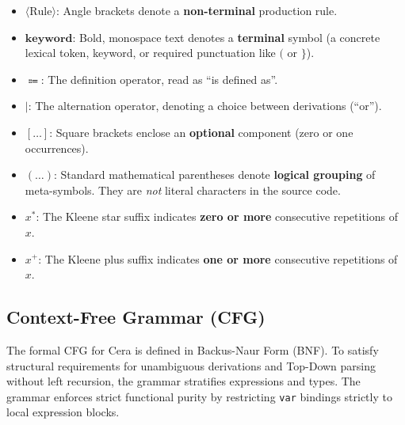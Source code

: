 \documentclass[11pt, a4paper]{article}
\begin{document}
\begin{itemize}
    \item $\langle \text{Rule} \rangle$: Angle brackets denote a \textbf{non-terminal} production rule.
    \item $\mathbf{keyword}$: Bold, monospace text denotes a \textbf{terminal} symbol (a concrete lexical token, keyword, or required punctuation like $\mathbf{(}$ or $\mathbf{\}}$).
    \item $\Coloneqq$: The definition operator, read as ``is defined as''.
    \item $\mid$: The alternation operator, denoting a choice between derivations (``or'').
    \item $[ \dots ]$: Square brackets enclose an \textbf{optional} component (zero or one occurrences).
    \item $( \dots )$: Standard mathematical parentheses denote \textbf{logical grouping} of meta-symbols. They are \textit{not} literal characters in the source code.
    \item $x^*$: The Kleene star suffix indicates \textbf{zero or more} consecutive repetitions of $x$.
    \item $x^+$: The Kleene plus suffix indicates \textbf{one or more} consecutive repetitions of $x$.
\end{itemize}

\subsection{Context-Free Grammar (CFG)}

The formal CFG for Cera is defined in Backus-Naur Form (BNF). To satisfy structural requirements for unambiguous derivations and Top-Down parsing without left recursion, the grammar stratifies expressions and types. The grammar enforces strict functional purity by restricting \texttt{var} bindings strictly to local expression blocks.
\end{document}
